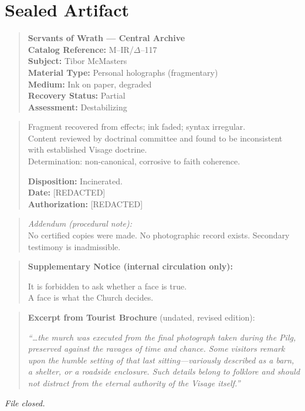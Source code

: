 \section*{Sealed Artifact}


\begin{quote}
\textbf{Servants of Wrath --- Central Archive} \\
\textbf{Catalog Reference:} M--IR/$\Delta$--117 \\
\textbf{Subject:} Tibor McMasters \\
\textbf{Material Type:} Personal holographs (fragmentary) \\
\textbf{Medium:} Ink on paper, degraded \\
\textbf{Recovery Status:} Partial \\
\textbf{Assessment:} Destabilizing
\end{quote}

\begin{quote}
Fragment recovered from effects; ink faded; syntax irregular. \\
Content reviewed by doctrinal committee and found to be inconsistent with established Visage doctrine. \\
Determination: non-canonical, corrosive to faith coherence.

\medskip

\textbf{Disposition:} Incinerated. \\
\textbf{Date:} [REDACTED] \\
\textbf{Authorization:} [REDACTED]
\end{quote}

\begin{quote}
\emph{Addendum (procedural note):} \\
No certified copies were made. No photographic record exists. Secondary testimony is inadmissible.
\end{quote}

\bigskip

\begin{quote}
\textbf{Supplementary Notice (internal circulation only):}

\medskip

It is forbidden to ask whether a face is true. \\
A face is what the Church decides.
\end{quote}

\bigskip

\begin{quote}
\textbf{Excerpt from Tourist Brochure} (undated, revised edition):

\medskip

\emph{``\ldots the murch was executed from the final photograph taken during the Pilg, preserved against the ravages of time and chance. Some visitors remark upon the humble setting of that last sitting---variously described as a barn, a shelter, or a roadside enclosure. Such details belong to folklore and should not distract from the eternal authority of the Visage itself.''}
\end{quote}

\bigskip

\begin{center}
\emph{File closed.}
\end{center}
